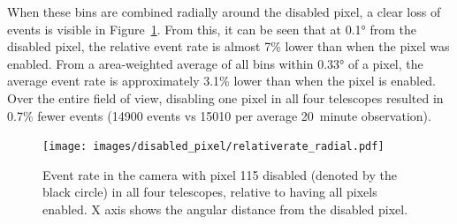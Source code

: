     When these bins are combined radially around the disabled pixel, a clear loss of events is visible in Figure~\ref{fig:dpix_rel_radial}.
    From this, it can be seen that at \ang{0.1} from the disabled pixel, the relative event rate is almost 7\% lower than when the pixel was enabled.
    From a area-weighted average of all bins within \ang{0.33} of a pixel, the average event rate is approximately 3.1\% lower than when the pixel is enabled.
    Over the entire field of view, disabling one pixel in all four telescopes resulted in 0.7\% fewer events (14900 events vs 15010 per average \SI{20}{minute} observation).
    
    \begin{figure}[ht]
      \centering
      \texttt{[image: images/disabled\_pixel/relativerate\_radial.pdf]}
      \caption[Relative Event Rate After Disabling Camera Pixels]{
        Event rate in the camera with pixel 115 disabled (denoted by the black circle) in all four telescopes, relative to having all pixels enabled.
        X axis shows the angular distance from the disabled pixel.
      }
      \label{fig:dpix_rel_radial}
    \end{figure}

    
    
